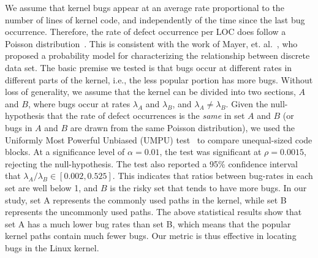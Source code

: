 We assume that kernel bugs appear at an average rate proportional to the
number of lines of kernel code, and independently of the time since the last
bug occurrence. Therefore, the rate of defect occurrence per LOC does
follow a Poisson distribution~\cite{Poisson-distribution}.
This is consistent with the work of Mayer, et. al.~\cite{mayer1989probability}, who
proposed a probability model for characterizing the relationship between discrete
data set.
The basic premise we tested is that bugs occur at different rates in different
parts of the kernel,
i.e., the less popular portion has more bugs. Without
loss of generality, we assume that the kernel can be divided into two sections,
$A$ and $B$, where bugs occur at rates $\lambda_A$ and
$\lambda_B$, and $\lambda_A \neq \lambda_B$. Given the null-hypothesis
that the rate of defect occurrences is the \textit{same} in set $A$ and $B$
(or bugs in $A$ and $B$ are drawn from the same Poisson distribution),
we used the Uniformly Most Powerful Unbiased (UMPU) test~\cite{shiue1982experiment}
to compare unequal-sized code blocks.
At a significance level of $\alpha=0.01$, the test was significant at
$\rho=0.0015$, rejecting the null-hypothesis.
The test also reported a 95\% confidence interval that $\lambda_A / \lambda_B
\in [0.002, 0.525]$. This indicates that ratios between bug-rates in each set are well
below 1, and $B$ is the risky set that tends to have more bugs.
In our study, set A represents the commonly used paths in the kernel, while set B
represents the uncommonly used paths. The above statistical results show that
set A has a much lower bug rates than set B, which means that the popular kernel paths
contain much fewer bugs. Our metric is thus effective in locating bugs in the Linux kernel.

